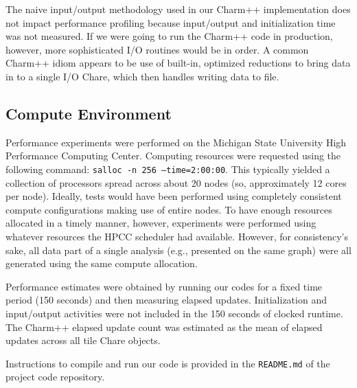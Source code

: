 The naive input/output methodology used in our Charm++ implementation does not impact performance profiling because input/output and initialization time was not measured.
If we were going to run the Charm++ code in production, however, more sophisticated I/O routines would be in order.
A common Charm++ idiom appears to be use of built-in, optimized reductions to bring data in to a single I/O Chare, which then handles writing data to file.

\subsection{Compute Environment}

Performance experiments were performed on the Michigan State University High Performance Computing Center.
Computing resources were requested using the following command: \texttt{salloc -n 256 --time=2:00:00}.
This typically yielded a collection of processors spread across about 20 nodes (so, approximately 12 cores per node).
Ideally, tests would have been performed using completely consistent compute configurations making use of entire nodes.
To have enough resources allocated in a timely manner, however, experiments were performed using whatever resources the HPCC scheduler had available.
However, for consistency's sake, all data part of a single analysis (e.g., presented on the same graph) were all generated using the same compute allocation.

Performance estimates were obtained by running our codes for a fixed time period (150 seconds) and then measuring elapsed updates.
Initialization and input/output activities were not included in the 150 seconds of clocked runtime.
The Charm++ elapsed update count was estimated as the mean of elapsed updates across all tile Chare objects.

Instructions to compile and run our code is provided in the \texttt{README.md} of the project code repository.

